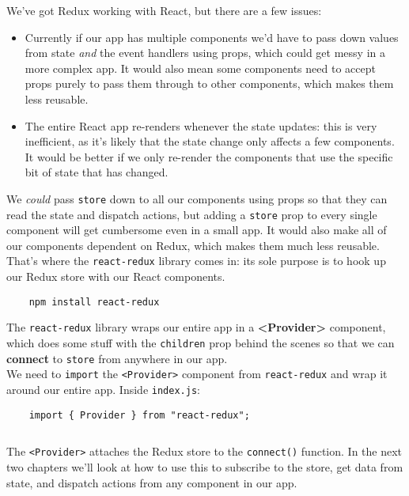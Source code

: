 We've got Redux working with React, but there are a few issues:

\begin{itemize}
    \item Currently if our app has multiple components we'd have to pass down values from state \textit{and} the event handlers using props, which could get messy in a more complex app. It would also mean some components need to accept props purely to pass them through to other components, which makes them less reusable.
    \item The entire React app re-renders whenever the state updates: this is very inefficient, as it's likely that the state change only affects a few components. It would be better if we only re-render the components that use the specific bit of state that has changed.
\end{itemize}

We \textit{could} pass \texttt{store} down to all our components using props so that they can read the state and dispatch actions, but adding a \texttt{store} prop to every single component will get cumbersome even in a small app. It would also make all of our components dependent on Redux, which makes them much less reusable.
\\

That's where the \texttt{react-redux} library comes in: its sole purpose is to hook up our Redux store with our React components.

\begin{verbatim}
    npm install react-redux
\end{verbatim}

The \texttt{react-redux} library wraps our entire app in a \textbf{<Provider>} component, which does some stuff with the \texttt{children} prop behind the scenes so that we can \textbf{connect} to \texttt{store} from anywhere in our app.
\\

We need to \texttt{import} the \texttt{<Provider>} component from \texttt{react-redux} and wrap it around our entire app. Inside \texttt{index.js}:

\begin{verbatim}
    import { Provider } from "react-redux";
\end{verbatim}

\inputminted{jsx}{02/figures/01/01-index.js}

The \texttt{<Provider>} attaches the Redux store to the \texttt{connect()} function. In the next two chapters we'll look at how to use this to subscribe to the store, get data from state, and dispatch actions from any component in our app.
\\

